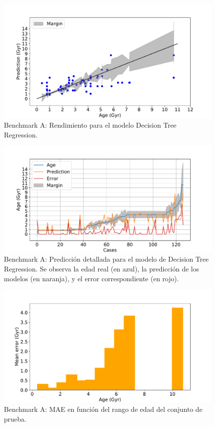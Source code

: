 \begin{figure}[H]
\begin{center}
 \includegraphics[width=0.8\linewidth]{Figuras/Experimentos/B_A_dtr_1.pdf}
\end{center}
\caption{Benchmark A: Rendimiento para el modelo Decision Tree Regression.}
 \label{fig:benchA_details_dtr_1}
\end{figure}

\begin{figure}[H]
\begin{center}
 \includegraphics[width=0.8\linewidth]{Figuras/Experimentos/B_A_dtr_2.pdf}
\end{center}
\caption{Benchmark A: Predicción detallada para el modelo de Decision Tree Regression. Se observa la edad real (en azul), la predicción de los modelos (en naranja), y el error correspondiente (en rojo).}
 \label{fig:benchA_details_dtr_2}
\end{figure}

\begin{figure}[H]
\begin{center}
 \includegraphics[width=0.8\linewidth]{Figuras/Experimentos/B_A_dtr_3.pdf}
\end{center}
\caption{Benchmark A: MAE en función del rango de edad del conjunto de prueba.}
 \label{fig:benchA_details_dtr_3}
\end{figure}

